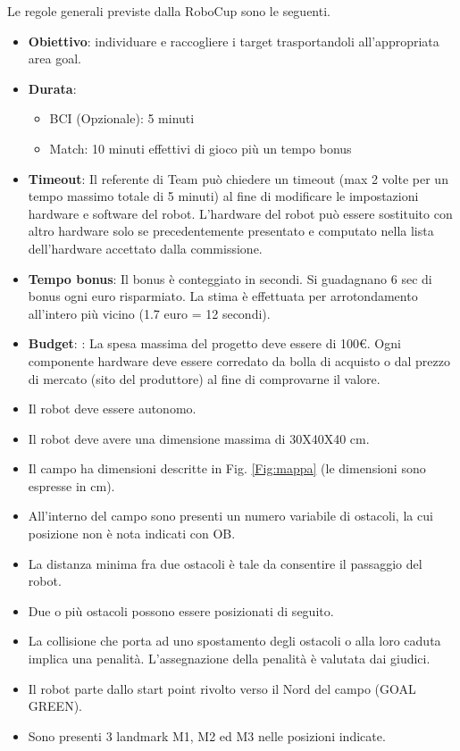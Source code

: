 \documentclass[a4paper,12pt,italian]{article}
\begin{document}
Le regole generali previste dalla RoboCup sono le seguenti.
\begin{itemize}
	\item \textbf{Obiettivo}: individuare e raccogliere i target trasportandoli all'appropriata area goal.
	\item \textbf{Durata}: 
		\begin{itemize}
			\item BCI (Opzionale): 5 minuti
			\item Match: 10 minuti effettivi di gioco più un tempo bonus
		\end{itemize}
	\item \textbf{Timeout}: Il referente di Team può chiedere un timeout (max 2 volte per un tempo massimo totale di 5 minuti) al fine di modificare le impostazioni hardware e software del robot. L’hardware del robot può essere sostituito con altro hardware solo se precedentemente presentato e computato nella lista dell’hardware accettato dalla commissione.
	\item \textbf{Tempo bonus}: Il bonus è conteggiato in secondi. Si guadagnano 6 sec di bonus ogni euro risparmiato. La stima è effettuata per arrotondamento all’intero più vicino (1.7 euro = 12 secondi).
	\item \textbf{Budget}: : La spesa massima del progetto deve essere di 100\euro{}. Ogni componente hardware deve essere corredato da bolla di acquisto o dal prezzo di mercato (sito del produttore) al fine di comprovarne il valore.
	\item Il robot deve essere autonomo.
	\item Il robot deve avere una dimensione massima di 30X40X40 cm.
	\item Il campo ha dimensioni descritte in Fig. \ref{Fig:mappa} (le dimensioni sono espresse in cm).
	\item All’interno del campo sono presenti un numero variabile di ostacoli, la cui posizione non è nota indicati con OB.
	\item La distanza minima fra due ostacoli è tale da consentire il passaggio del robot.
	\item Due o più ostacoli possono essere posizionati di seguito.
	\item La collisione che porta ad uno spostamento degli ostacoli o alla loro caduta implica una penalità. L’assegnazione della penalità è valutata dai giudici.
	\item Il robot parte dallo start point rivolto verso il Nord del campo (GOAL GREEN).
	\item Sono presenti 3 landmark M1, M2 ed M3 nelle posizioni indicate.

\end{itemize}
\end{document}
